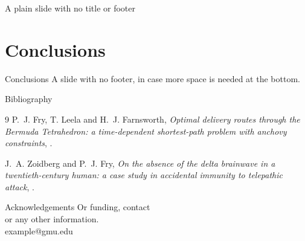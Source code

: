 \documentclass[
  aspectratio=169,
]{beamer}
\begin{document}
\begin{frame}[plain]
\vfill
\centerline{A plain slide with no title or footer}
\vfill
\end{frame}

\section{Conclusions}
\begin{frame}[t, plain]{Conclusions}
  A slide with no footer, in case more space is needed at the bottom.
\end{frame}

\begin{frame}[sideblock]{Bibliography}

\begin{leftblock}
\begin{thebibliography}{9}
  P.~J. Fry, T. Leela and H.~J. Farnsworth,
  \emph{Optimal delivery routes through the Bermuda Tetrahedron: a time-dependent shortest-path problem with anchovy constraints},
  .
  
  J.~A. Zoidberg and P.~J. Fry,
  \emph{On the absence of the delta brainwave in a twentieth-century human: a case study in accidental immunity to telepathic attack},
  .
\end{thebibliography}
\end{leftblock}%
\begin{rightblock}{Acknowledgements}
Or funding, contact\\
or any other information.\\[1em]
example@gmu.edu
\end{rightblock}

\end{frame}

\makeoutro
\end{document}
